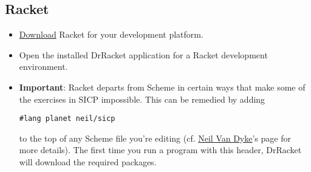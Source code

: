 \documentclass[11pt]{article}
\begin{document}
\subsection{Racket}
\label{sec-2-2}
\begin{itemize}
\item \href{http://racket-lang.org/download/}{Download} Racket for your development platform.
\item Open the installed DrRacket application for a Racket development
environment.
\item \textbf{Important}: Racket departs from Scheme in certain ways that make
some of the exercises in SICP impossible.  This can be remedied
by adding
\begin{verbatim}
#lang planet neil/sicp
\end{verbatim}
to the top of any Scheme file you're editing (cf. \href{http://www.neilvandyke.org/racket-sicp/}{Neil Van Dyke}'s
page for more details).  The first time you run a program with
this header, DrRacket will download the required packages.
\end{itemize}
\end{document}
